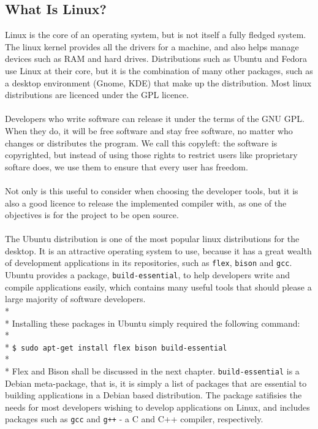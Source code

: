 \documentclass[12pt]{report}
\begin{document}
\subsection{What Is Linux?}\label{subsec:what_is_linux}
Linux is the core of an operating system, but is not itself a fully fledged system.  The linux kernel provides all the drivers for a machine, and also helps manage devices such as RAM and hard drives.  Distributions such as Ubuntu and Fedora use Linux at their core, but it is the combination of many other packages, such as a desktop environment (Gnome, KDE) that make up the distribution.  Most linux distributions are licenced under the GPL licence.\\
\\
Developers who write software can release it under the terms of the GNU GPL.  When they do, it will be free software and stay free software, no matter who changes or distributes the program.  We call this copyleft: the software is copyrighted, but instead of using those rights to restrict users like proprietary softare does, we use them to ensure that every user has freedom. \citep{quickguidetogpl3}
\\
\\
Not only is this useful to consider when choosing the developer tools, but it is also a good licence to release the implemented compiler with, as one of the objectives is for the project to be open source.\\
\\
The Ubuntu distribution is one of the most popular linux distributions for the desktop.  It is an attractive operating system to use, because it has a great wealth of development applications in its repositories, such as \texttt{flex}, \texttt{bison} and \texttt{gcc}.  Ubuntu provides a package, \texttt{build-essential}, to help developers write and compile applications easily, which contains many useful tools that should please a large majority of software developers.\\*
\\*
Installing these packages in Ubuntu simply required the following command:
\\*
\\*
\texttt{\$ sudo apt-get install flex bison build-essential}
\\*
\\*
Flex and Bison shall be discussed in the next chapter.  \texttt{build-essential} is a Debian meta-package, that is, it is simply a list of packages that are essential to building applications in a Debian based distribution.  The package satifisies the needs for most developers wishing to develop applications on Linux, and includes packages such as \texttt{gcc} and \texttt{g++} - a C and C++ compiler, respectively.
\end{document}
